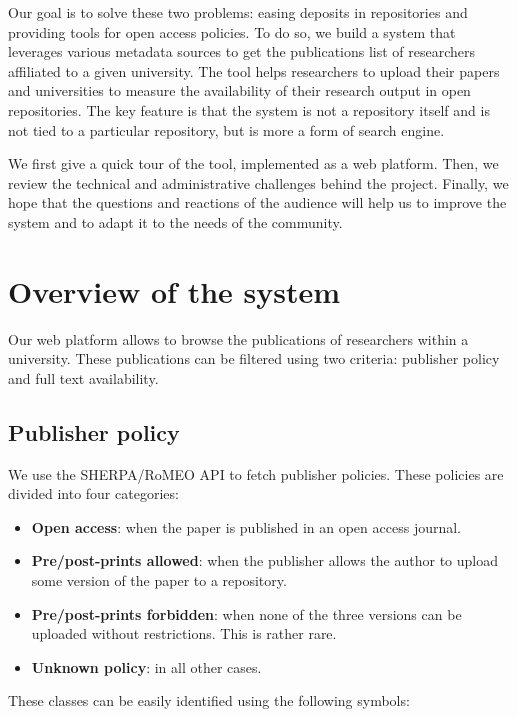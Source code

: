 \documentclass[a4paper]{article}
\begin{document}
Our goal is to solve these two problems: easing deposits in repositories
and providing tools for open access policies. To do so, we build a
system that leverages various metadata sources to get the publications
list of researchers affiliated to a given university. The tool helps
researchers to upload their papers and universities to measure the
availability of their research output in open repositories. The key
feature is that the system is not a repository itself and is not tied to
a particular repository, but is more a form of search engine.

We first give a quick tour of the tool, implemented as a web platform.
Then, we review the technical and administrative challenges behind the
project. Finally, we hope that the questions and reactions of the
audience will help us to improve the system and to adapt it to the needs
of the community.

\section{Overview of the system}

Our web platform allows to browse the publications of researchers within
a university. These publications can be filtered using two criteria:
publisher policy and full text availability.

\subsection{Publisher policy}

We use the SHERPA/RoMEO API to fetch publisher policies.
These policies are divided into four categories:

\begin{itemize}
\item
  \textbf{Open access}: when the paper is published in an open access
  journal.
\item
  \textbf{Pre/post-prints allowed}: when the publisher allows the author
  to upload some version of the paper to a repository.
\item
  \textbf{Pre/post-prints forbidden}: when none of the three versions
  can be uploaded without restrictions. This is rather rare.
\item
  \textbf{Unknown policy}: in all other cases.
\end{itemize}

These classes can be easily identified using the following symbols:
\end{document}
